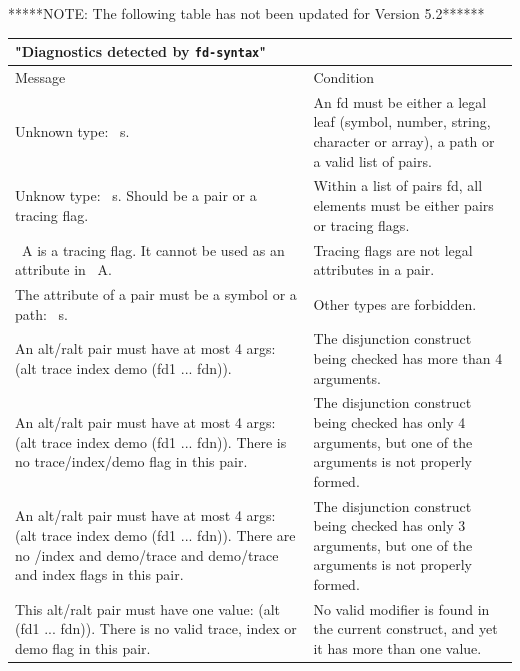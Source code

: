 \documentclass[10pt,a4paper]{report}
\begin{document}
*****NOTE: The following table has not been updated for Version 5.2******

\begin{center}
    \begin{tabular}{ | p{3in} | p{3in} |}
    \hline
	"Diagnostics detected by {\tt fd-syntax}" \\ \hline
	
	Message & Condition \\ \hline

	Unknown type: ~s. & 
	An fd must be either a legal leaf (symbol, number, string, character or array), a path or a valid list of pairs. \\ \hline

Unknow type: ~s.  Should be a pair or a tracing flag. &Within a list of
pairs fd, all elements must be either pairs or tracing flags.
\index{tracing flag}  \\ \hline

~A is a tracing flag.  It cannot be used as an attribute in ~A. &Tracing
flags are not legal attributes in a pair.
\index{tracing flag}  \\ \hline

The attribute of a pair must be a symbol or a path: ~s. &Other types are
forbidden.  \\ \hline

An alt/ralt pair must have at most 4 args: (alt {trace} {index} {demo} (fd1
... fdn)). &The disjunction construct being checked has more than 4 arguments.  \\ \hline

An alt/ralt pair must have at most 4 args: (alt {trace} {index} {demo} (fd1
... fdn)).  There is no trace/index/demo flag in this pair. &The
disjunction construct being checked has only 4 arguments, but one of the
arguments is not properly formed.  \\ \hline

An alt/ralt pair must have at most 4 args: (alt {trace} {index} {demo} (fd1
... fdn)).  There are no /index and demo/trace and demo/trace and index
flags in this pair. &The disjunction construct being checked has only 3
arguments, but one of the arguments is not properly formed.  \\ \hline

This alt/ralt pair must have one value: (alt (fd1 ... fdn)).  There is no
valid trace, index or demo flag in this pair. &No valid modifier is found
in the current construct, and yet it has more than one value.  \\ \hline


\end{tabular}
\end{center}
\end{document}
